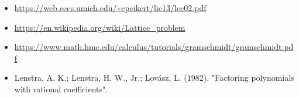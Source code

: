 \documentclass{article}
\begin{document}
\begin{itemize}\itemsep .125cm
	\item \url{https://web.eecs.umich.edu/~cpeikert/lic13/lec02.pdf}
	\item \url{https://en.wikipedia.org/wiki/Lattice_problem}
	\item \url{https://www.math.hmc.edu/calculus/tutorials/gramschmidt/gramschmidt.pdf}
	\item Lenstra, A. K.; Lenstra, H. W., Jr.; Lovász, L. (1982). "Factoring polynomials with rational coefficients".
\end{itemize}

\ifx\onefile\undefined
	
\end{document}
